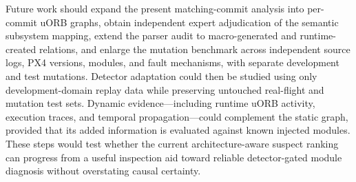 Future work should expand the present matching-commit analysis into per-commit uORB graphs, obtain independent expert adjudication of the semantic subsystem mapping, extend the parser audit to macro-generated and runtime-created relations, and enlarge the mutation benchmark across independent source logs, PX4 versions, modules, and fault mechanisms, with separate development and test mutations. Detector adaptation could then be studied using only development-domain replay data while preserving untouched real-flight and mutation test sets. Dynamic evidence---including runtime uORB activity, execution traces, and temporal propagation---could complement the static graph, provided that its added information is evaluated against known injected modules. These steps would test whether the current architecture-aware suspect ranking can progress from a useful inspection aid toward reliable detector-gated module diagnosis without overstating causal certainty.
